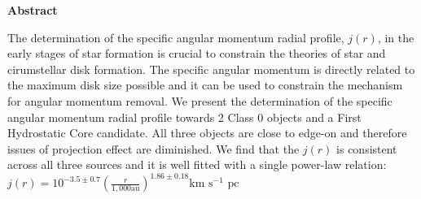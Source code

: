 \textbf{Abstract}

The determination of the specific angular momentum radial profile, $j(r)$, in the early stages of star formation is crucial to constrain the theories of star and cirumstellar disk formation.
The specific angular momentum is directly related to the maximum disk size possible and 
it can be used to constrain the mechanism for angular momentum removal. 
We present the determination of the specific angular momentum radial profile towards 2 Class 0 objects and a First Hydrostatic Core candidate. 
All three objects are close to edge-on and therefore issues of projection effect are diminished. 
We find that the $j(r)$ is consistent across all three sources and it is well fitted with a single power-law relation: 
$j(r) = 10^{-3.5\pm 0.7}\left( \frac{r}{1,000 \textrm{au}}\right)^{1.86\pm0.18} \textrm{km s$^{-1}$ pc}$